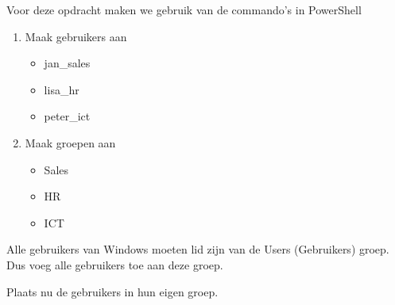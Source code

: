 Voor deze opdracht maken we gebruik van de commando's in PowerShell

\begin{enumerate}
\item Maak gebruikers aan
    \begin{itemize}
    \item jan\_sales
    \item lisa\_hr
    \item peter\_ict
    \end{itemize}
\item Maak groepen aan
    \begin{itemize}
    \item Sales
    \item HR
    \item ICT
    \end{itemize}
\end{enumerate}

Alle gebruikers van Windows moeten lid zijn van de Users (Gebruikers) groep. Dus voeg alle gebruikers toe aan deze groep.

Plaats nu de gebruikers in hun eigen groep.

